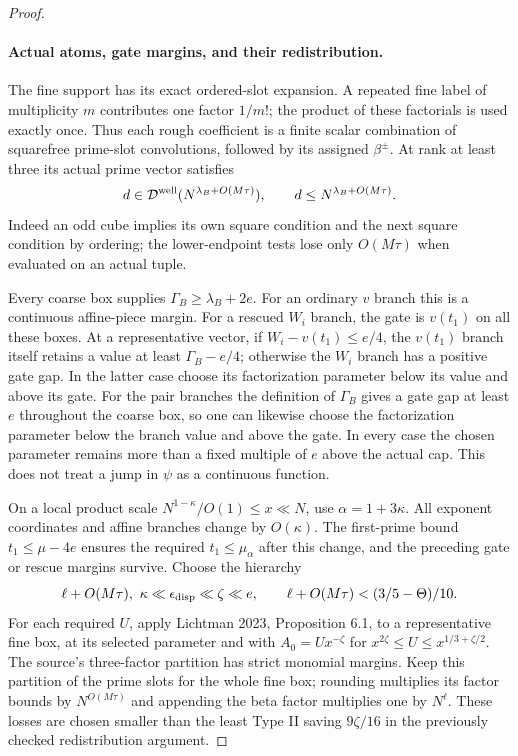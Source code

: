 \documentclass[11pt]{article}
\begin{document}
\begin{proof}
\paragraph{Actual atoms, gate margins, and their redistribution.}
The fine support has its exact ordered-slot expansion. A repeated
fine label of multiplicity $m$ contributes one factor $1/m!$;
the product of these factorials is used exactly once. Thus each
rough coefficient is a finite scalar combination of squarefree
prime-slot convolutions, followed by its assigned $\beta^\pm$.
At rank at least three its actual prime vector satisfies
\[
 d\in\mathcal D^{\rm well}
       (N^{\lambda_B+O(M\tau)}),\qquad
 d\le N^{\lambda_B+O(M\tau)}.
\]
Indeed an odd cube implies its own square condition and the next
square condition by ordering; the lower-endpoint tests lose only
$O(M\tau)$ when evaluated on an actual tuple.

Every coarse box supplies $\Gamma_B\ge\lambda_B+2e$.
For an ordinary $v$ branch this is a continuous affine-piece margin.
For a rescued $W_i$ branch, the gate is $v(t_1)$ on all these boxes.
At a representative vector, if $W_i-v(t_1)\le e/4$, the $v(t_1)$
branch itself retains a value at least $\Gamma_B-e/4$; otherwise
the $W_i$ branch has a positive gate gap. In the latter case choose
its factorization parameter below its value and above its gate.
For the pair branches the definition of $\Gamma_B$ gives a gate
gap at least $e$ throughout the coarse box, so one can likewise
choose the factorization parameter below the branch value and
above the gate. In every case the chosen parameter remains more
than a fixed multiple of $e$ above the actual cap. This does not
treat a jump in $\psi$ as a continuous function.

On a local product scale
$N^{1-\kappa}/O(1)\le x\ll N$, use $\alpha=1+3\kappa$.
All exponent coordinates and affine branches change by $O(\kappa)$.
The first-prime bound $t_1\le\mu-4e$ ensures the required
$t_1\le\mu_\alpha$ after this change, and the preceding gate or
rescue margins survive. Choose the hierarchy
\[
 \ell+O(M\tau),\ \kappa\ll\epsilon_{\rm disp}\ll\zeta\ll e,
 \qquad \ell+O(M\tau)<(3/5-\Theta)/10.
\]
For each required $U$, apply Lichtman 2023, Proposition 6.1, to
a representative fine box, at its selected parameter and with
$A_0=Ux^{-\zeta}$ for
$x^{2\zeta}\le U\le x^{1/3+\zeta/2}$.
The source's three-factor partition has strict monomial margins.
Keep this partition of the prime slots for the whole fine box;
rounding multiplies its factor bounds by $N^{O(M\tau)}$ and
appending the beta factor multiplies one by $N^\ell$.
These losses are chosen smaller than the least Type II saving
$9\zeta/16$ in the previously checked redistribution argument.


\end{proof}
\end{document}
